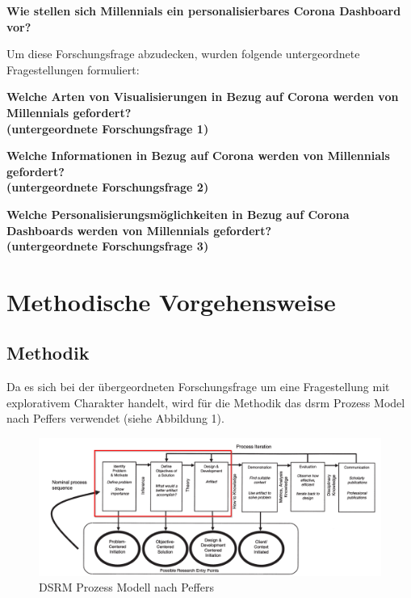 \documentclass[12pt, oneside]{article}
\begin{document}
\begin{center}
    \textbf{Wie stellen sich Millennials ein personalisierbares Corona Dashboard vor?}
\end{center}

Um diese Forschungsfrage abzudecken, wurden folgende untergeordnete Fragestellungen formuliert:

\begin{center}
    \textbf{Welche Arten von Visualisierungen in Bezug auf Corona werden von Millennials gefordert?\\
        (untergeordnete Forschungsfrage 1)}
\end{center}

\begin{center}
    \textbf{Welche Informationen in Bezug auf Corona werden von Millennials gefordert?\\
        (untergeordnete Forschungsfrage 2)}
\end{center}

\begin{center}
    \textbf{Welche Personalisierungsmöglichkeiten in Bezug auf Corona Dashboards werden von Millennials gefordert?\\
        (untergeordnete Forschungsfrage 3)}
\end{center}

\clearpage
\section{Methodische Vorgehensweise}
\subsection{Methodik}
Da es sich bei der übergeordneten Forschungsfrage um eine Fragestellung mit explorativem Charakter handelt, wird für die Methodik das \Gls{dsrm} Prozess Model nach Peffers verwendet (siehe Abbildung 1).


\begin{figure}[ht]
    \includegraphics[width=12cm]{images/peffers_dsr_model.png}
    \centering
    \caption{DSRM Prozess Modell nach Peffers ~\citep{K.Peffers.2007}}
\end{figure}
\end{document}
